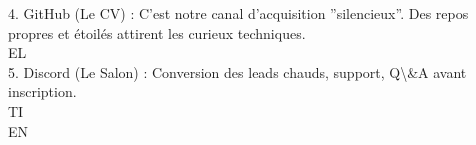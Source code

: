 4. GitHub (Le CV) : C’est notre canal d’acquisition ”silencieux”. Des repos propres et étoilés attirent les curieux techniques.\\
\vspace{0.5em}
\vspace{0.5em}
\vspace{0.5em}
\vspace{0.5em}
EL\\
5. Discord (Le Salon) : Conversion des leads chauds, support, Q\textbackslash{}&A avant inscription.\\
\vspace{0.5em}
\vspace{0.5em}
\vspace{0.5em}
\vspace{0.5em}
TI\\
EN\\
